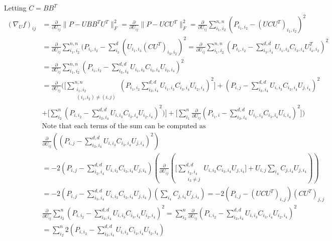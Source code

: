 \documentclass{report}
\begin{document}
   	Letting $ C = BB^T $
   	\begin{align*}
   		 (\nabla_{U}f)_{ij}
   		 &= \frac{\partial}{\partial U_{ij}}\|P - UBB^TU^T\|_F^2 
   		  = \frac{\partial}{\partial U_{ij}}\|P - UCU^T\|_F^2 
   		  = \frac{\partial}{\partial U_{ij}}\displaystyle \sum_{i_1,i_2}^{n,n} (P_{i_1,i_2} -  (UCU^T)_{i_1,i_2})^2 \\
   		 &= \frac{\partial}{\partial U_{ij}} \sum_{i_1,i_2}^{n,n} (P_{i_1,i_2} -    \sum_{i_3}^{d}(U_{i_1,i_3}(CU^T)_{i_3,i_2})^2 
   		  = \frac{\partial}{\partial U_{ij}} \sum_{i_1,i_2}^{n,n} (P_{i_1,i_2} - \sum_{i_3,i_4}^{d,d}U_{i_1,i_3}C_{i_3,i_4}U^T_{i_4,i_2})^2 \\
   		 &= \frac{\partial}{\partial U_{ij}} \sum_{i_1,i_2}^{n,n} (P_{i_1,i_2} - \sum_{i_3,i_4}^{d,d}U_{i_1,i_3}C_{i_3,i_4}U_{i_2,i_4})^2 \\
   		 &= \frac{\partial}{\partial U_{ij}} (\big[\sum_{\substack{i_1,i_2 \\ (i_1,i_2) \neq (i,j)}}^{n,n} (P_{i_1,i_2} \sum_{i_3,i_4}^{d,d}U_{i_1,i_3}C_{i_3,i_4}U_{i_2,i_4})^2 \big]
   		 + (P_{i,j} -\sum_{i_3,i_4}^{d,d}U_{i,i_3}C_{i_3,i_4}U_{j,i_4})^2 \\
   		 &+ \big[\sum_{i_2}^n(P_{i,i_2} - \sum_{i_3,i_4}^{d,d}U_{i,i_3}C_{i_3,i_4}U_{i_2,i_4})^2) \big]
   		  +\big[\sum_{i_1}^n\frac{\partial}{\partial U_{ij}}(P_{i_1,i} - \sum_{i_3,i_4}^{d,d}U_{i_1,i_3}C_{i_3,i_4}U_{i,i_4})^2\big]) \\
   		 &\text{Note that each terms of the sum can be computed as}\\
   		 & \frac{\partial}{\partial U_{ij}} ((P_{i,j} -  \sum_{i_3,i_4}^{d,d}U_{i,i_3}C_{i_3,i_4}U_{j,i_4})^2) \\
   		 &=-2(P_{i,j} -  \sum_{i_3,i_4}^{d,d}U_{i,i_3}C_{i_3,i_4}U_{j,i_4})
   		 (\frac{\partial}{\partial U_{ij}}(\big[\sum_{\substack{i_3,i_4 \\ i_3 \neq j}}^{d,d}U_{i,i_3}C_{i_3,i_4}U_{j,i_4}\big] +
   		 U_{i,j}\sum_{i_4}C_{j,i_4}U_{j,i_4}))\\
   		 &= -2(P_{i,j} -  \sum_{i_3,i_4}^{d,d}U_{i,i_3}C_{i_3,i_4}U_{j,i_4})
   		 (\sum_{i_4}C_{j,i_4}U_{j,i_4}) = -2(P_{i,j} - (UCU^T)_{i,j})(CU^T)_{j,j}\\
   		 & \frac{\partial}{\partial U_{ij}}\sum_{i_2}^n(P_{i,i_2} - \sum_{i_3,i_4}^{d,d}U_{i,i_3}C_{i_3,i_4}U_{i_2,i_4})^2 
   		 = \sum_{i_2}^n\frac{\partial}{\partial U_{ij}}(P_{i,i_2} - \sum_{i_3,i_4}^{d,d}U_{i,i_3}C_{i_3,i_4}U_{i_2,i_4})^2\\
   		 &= \sum_{i_2}^n
   		 2(P_{i,i_2} - \sum_{i_3,i_4}^{d,d}U_{i,i_3}C_{i_3,i_4}U_{i_2,i_4})

\end{align*}
\end{document}
